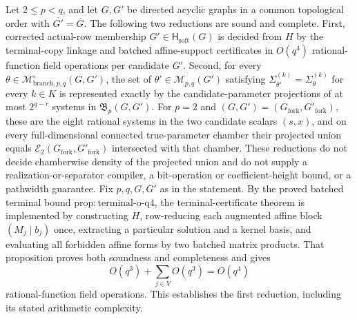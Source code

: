 Let \(2\le p<q\), and let \(G,G'\) be directed acyclic graphs in a common topological order with \(\overline{G'}=\overline G\).  The following two reductions are sound and complete.  First, corrected actual-row membership \(G'\in\mathsf H_{\mathrm{soft}}(G)\) is decided from \(H\) by the terminal-copy linkage and batched affine-support certificates in \(O(q^4)\) rational-function field operations per candidate \(G'\).  Second, for every \(\theta\in\mathcal M^{\circ}_{\mathrm{branch},p,q}(G,G')\), the set of \(\theta'\in\mathcal M_{p,q}(G')\) satisfying \(\Sigma_{\theta'}^{(k)}=\Sigma_{\theta}^{(k)}\) for every \(k\in K\) is represented exactly by the candidate-parameter projections of at most \(2^{q-r}\) systems in \(\mathfrak B_p(G,G')\).  For \(p=2\) and \((G,G')=(G_{\mathrm{fork}},G'_{\mathrm{fork}})\), these are the eight rational systems in the two candidate scalars \((s,x)\), and on every full-dimensional connected true-parameter chamber their projected union equals \(\mathcal E_2(G_{\mathrm{fork}},G'_{\mathrm{fork}})\) intersected with that chamber.  These reductions do not decide chamberwise density of the projected union and do not supply a realization-or-separator compiler, a bit-operation or coefficient-height bound, or a pathwidth guarantee.
Fix \(p,q,G,G'\) as in the statement.  By the proved batched terminal bound \(\mathrm{prop:terminal\text{-}o\text{-}q4}\), the terminal-certificate theorem is implemented by constructing \(H\), row-reducing each augmented affine block \((M_j\mid b_j)\) once, extracting a particular solution and a kernel basis, and evaluating all forbidden affine forms by two batched matrix products.  That proposition proves both soundness and completeness and gives
\[
 O(q^3)+\sum_{j\in V}O(q^3)=O(q^4)
\]
rational-function field operations.  This establishes the first reduction, including its stated arithmetic complexity.

